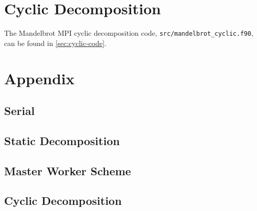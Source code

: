 \documentclass{article}
\begin{document}


\newpage
\section{Cyclic Decomposition}
\label{sec:cyclic}

The Mandelbrot MPI cyclic decomposition code,
\lstinline[style=ff]{src/mandelbrot_cyclic.f90}, can be found in
\autoref{sec:cyclic-code}.




\clearpage
\appendix
\section{Appendix}
\label{sec:appendix}

\newpage
\subsection{Serial}
\label{sec:serial-code}



\newpage
\subsection{Static Decomposition}
\label{sec:static-code}



\newpage
\subsection{Master Worker Scheme}
\label{sec:master-worker-code}



\newpage
\subsection{Cyclic Decomposition}
\label{sec:cyclic-code}


\end{document}
